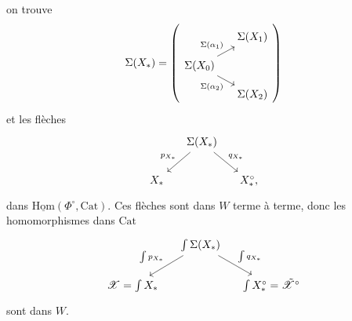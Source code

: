 \documentclass[11pt]{article}
\newcommand{\printedpage}[1]{\marginpar{\footnotesize p.~#1}}
\newcommand{\msp}[1]{\marginpar{\footnotesize [#1]}}
\newcommand{\Cat}{\mathrm{Cat}}
\newcommand{\Hom}{\mathrm{Hom}}
\newcommand{\sX}{\mathscr{X}}
\newcommand{\tsX}{\tilde{\mathscr{X}}}
\begin{document}
\msp{page 138}
on trouve
\[
\Sigma(X_*) =
\left(
\begin{tikzcd}[row sep=small, column sep=small]
 & \Sigma(X_1) \\
\Sigma(X_0) \arrow[ur, "\Sigma(\alpha_1)"] \arrow[dr, "\Sigma(\alpha_2)"'] & \\
 & \Sigma(X_2)
\end{tikzcd}
\right)
\]
et les flèches
\printedpage{94}
\[
\begin{tikzcd}[column sep=small]
 & \Sigma(X_*) \arrow[dl, "p_{X_*}"'] \arrow[dr, "q_{X_*}"] & \\
X_* & & X_*^\circ,
\end{tikzcd}
\]
dans $\underline{\Hom}(\Phi^\circ,\Cat)$. Ces flèches sont dans $W$ terme à terme, donc les homomorphismes dans $\Cat$
\[
\begin{tikzcd}[column sep=small]
 & \int\Sigma(X_*) \arrow[dl, "\int p_{X_*}"'] \arrow[dr, "\int q_{X_*}"] & \\
\sX=\int X_* & & \int X_*^\circ=\tsX^\circ
\end{tikzcd}
\]
sont dans $W$.
\end{document}
